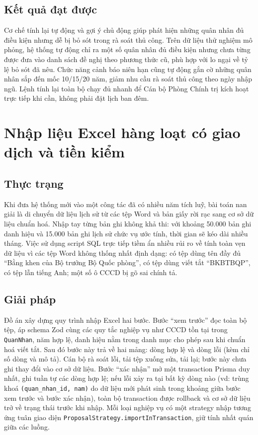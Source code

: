 \documentclass[../DoAn.tex]{subfiles}
\begin{document}
\subsection*{Kết quả đạt được}
Cơ chế tính lại tự động và gợi ý chủ động giúp phát hiện những quân nhân đủ điều kiện nhưng dễ bị bỏ sót trong rà soát thủ công. Trên dữ liệu thử nghiệm mô phỏng, hệ thống tự động chỉ ra một số quân nhân đủ điều kiện nhưng chưa từng được đưa vào danh sách đề nghị theo phương thức cũ, phù hợp với lo ngại về tỷ lệ bỏ sót đã nêu. Chức năng cảnh báo niên hạn cũng tự động gắn cờ những quân nhân sắp đến mốc 10/15/20 năm, giảm nhu cầu rà soát thủ công theo ngày nhập ngũ. Lệnh tính lại toàn bộ chạy đủ nhanh để Cán bộ Phòng Chính trị kích hoạt trực tiếp khi cần, không phải đặt lịch ban đêm.

\section{Nhập liệu Excel hàng loạt có giao dịch và tiền kiểm}
\label{section:5.4}

\subsection*{Thực trạng}
Khi đưa hệ thống mới vào một công tác đã có nhiều năm tích luỹ, bài toán nan giải là di chuyển dữ liệu lịch sử từ các tệp Word và bản giấy rời rạc sang cơ sở dữ liệu chuẩn hoá. Nhập tay từng bản ghi không khả thi: với khoảng 50.000 bản ghi danh hiệu và 15.000 bản ghi lịch sử chức vụ ước tính, thời gian sẽ kéo dài nhiều tháng. Việc sử dụng script SQL trực tiếp tiềm ẩn nhiều rủi ro về tính toàn vẹn dữ liệu vì các tệp Word không thống nhất định dạng: có tệp dùng tên đầy đủ ``Bằng khen của Bộ trưởng Bộ Quốc phòng'', có tệp dùng viết tắt ``BKBTBQP'', có tệp lẫn tiếng Anh; một số ô CCCD bị gõ sai chính tả.

\subsection*{Giải pháp}
Đồ án xây dựng quy trình nhập Excel hai bước. Bước ``xem trước'' đọc toàn bộ tệp, áp schema Zod cùng các quy tắc nghiệp vụ như CCCD tồn tại trong \texttt{QuanNhan}, năm hợp lệ, danh hiệu nằm trong danh mục cho phép sau khi chuẩn hoá viết tắt. Sau đó bước này trả về hai mảng: dòng hợp lệ và dòng lỗi (kèm chỉ số dòng và mô tả). Cán bộ rà soát lỗi, tải tệp xuống sửa, tải lại; bước này chưa ghi thay đổi vào cơ sở dữ liệu. Bước ``xác nhận'' mở một transaction Prisma duy nhất, ghi tuần tự các dòng hợp lệ; nếu lỗi xảy ra tại bất kỳ dòng nào (vd: trùng khoá \texttt{(quan\_nhan\_id, nam)} do dữ liệu mới phát sinh trong khoảng giữa bước xem trước và bước xác nhận), toàn bộ transaction được rollback và cơ sở dữ liệu trở về trạng thái trước khi nhập. Mỗi loại nghiệp vụ có một strategy nhập tương ứng tuân giao diện \texttt{ProposalStrategy.importInTransaction}, giữ tính nhất quán giữa các luồng.
\end{document}
